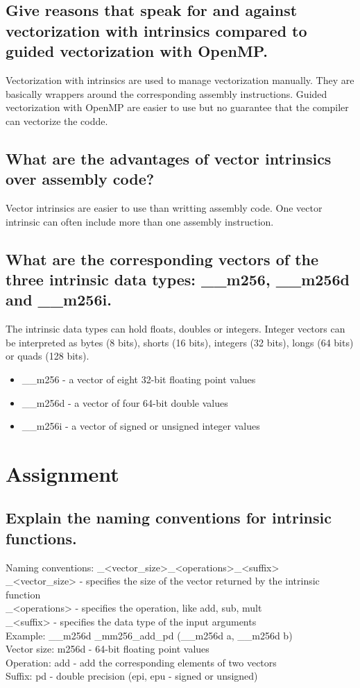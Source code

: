 \documentclass[runningheads]{llncs}
\begin{document}
\subsection{Give reasons that speak for and against vectorization with intrinsics compared to guided vectorization with OpenMP.}
Vectorization with intrinsics are used to manage vectorization manually. They are basically wrappers around the corresponding assembly instructions.
Guided vectorization with OpenMP are easier to use but no guarantee that the compiler can vectorize the codde.

\subsection{What are the advantages of vector intrinsics over assembly code?}
Vector intrinsics are easier to use than writting assembly code. One vector intrinsic can often include more than one
assembly instruction. 

\subsection{What are the corresponding vectors of the three intrinsic data types: \_\_m256, \_\_m256d and \_\_m256i.}
The intrinsic data types can hold floats, doubles or integers. Integer vectors can be interpreted as bytes (8 bits), shorts (16 bits), 
integers (32 bits), longs (64 bits) or quads (128 bits).

\begin{itemize}
	\item \_\_m256 - a vector of eight 32-bit floating point values 
	\item \_\_m256d - a vector of four 64-bit double values
	\item \_\_m256i - a vector of signed or unsigned integer values
\end{itemize}


\section{Assignment}

\subsection{Explain the naming conventions for intrinsic functions.}
Naming conventions: \_<vector\_size>\_<operations>\_<suffix> \\
\_<vector\_size> - specifies the size of the vector returned by the intrinsic function \\
\_<operations> - specifies the operation, like add, sub, mult \\
\_<suffix> - specifies the data type of the input arguments \\
Example: \_\_m256d \_mm256\_add\_pd (\_\_m256d a, \_\_m256d b) \\
Vector size: m256d - 64-bit floating point values \\
Operation: add - add the corresponding elements of two vectors \\
Suffix: pd - double precision (epi, epu - signed or unsigned)
\end{document}
